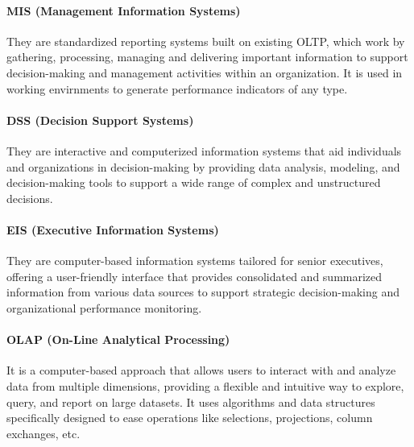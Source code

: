 \paragraph{MIS (Management Information Systems)}
They are standardized reporting systems built on existing OLTP, which work by gathering, processing, managing and delivering important information to support decision-making and management activities within an organization. It is used in working envirnments to generate performance indicators of any type.

\paragraph{DSS (Decision Support Systems)}
They are interactive and computerized information systems that aid individuals and organizations in decision-making by providing data analysis, modeling, and decision-making tools to support a wide range of complex and unstructured decisions.

\paragraph{EIS (Executive Information Systems)}
They are computer-based information systems tailored for senior executives, offering a user-friendly interface that provides consolidated and summarized information from various data sources to support strategic decision-making and organizational performance monitoring.

\paragraph{OLAP (On-Line Analytical Processing)}
It is a computer-based approach that allows users to interact with and analyze data from multiple dimensions, providing a flexible and intuitive way to explore, query, and report on large datasets. It uses algorithms and data structures specifically designed to ease operations like selections, projections, column exchanges, etc.

